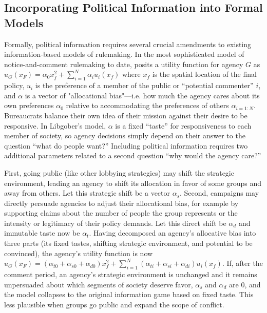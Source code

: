 \subsection{Incorporating Political Information into Formal Models}

Formally, political information requires several crucial amendments to existing information-based models of rulemaking. In the most sophisticated model of notice-and-comment rulemaking to date, \citet{Libgober2018} posits a utility function for agency $G$ as $u_G(x_F) = \alpha_0 x_f^2 + \sum_{i=1}^N \alpha_i u_i (x_f)$ where $x_f$ is the spatial location of the final policy, $u_i$ is the preference of a member of the public or ``potential commenter'' $i$, and $\alpha$ is a vector of "allocational bias"---i.e. how much the agency cares about its own preferences $\alpha_0$ relative to accommodating the preferences of others $\alpha_{i=1:N}$. Bureaucrats balance their own idea of their mission against their desire to be responsive. In Libgober's model, $\alpha$ is a fixed ``taste'' for responsiveness to each member of society, so agency decisions simply depend on their answer to the question ``what do people want?'' Including political information requires two additional parameters related to a second question ``why would the agency care?''

First, going public (like other lobbying strategies) may shift the strategic environment, leading an agency to shift its allocation in favor of some groups and away from others. Let this strategic shift be a vector $\alpha_s$. Second, campaigns may directly persuade agencies to adjust their allocational bias, for example by supporting claims about the number of people the group represents or the intensity or legitimacy of their policy demands. Let this direct shift be $\alpha_d$ and immutable taste now be $\alpha_t$. Having decomposed an agency's allocative bias into three parts (its fixed tastes, shifting strategic environment, and potential to be convinced), the agency's utility function is now  $u_G(x_F) =  (\alpha_{t0} + \alpha_{s0} + \alpha_{d0}) x_f^2 + \sum_{i=1}^N (\alpha_{ti} + \alpha_{si} + \alpha_{di}) u_i (x_f)$. If, after the comment period, an agency's strategic environment is unchanged and it remains unpersuaded about which segments of society deserve favor, $\alpha_s$ and $\alpha_d$ are 0, and the model collapses to the original information game based on fixed taste. This less plausible when groups go public and expand the scope of conflict. 

